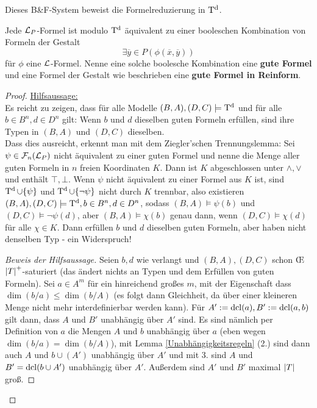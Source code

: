 Dieses B\&F-System beweist die Formelreduzierung in $\operatorname{T^d}$.
\begin{theorem}\label{Formelreduzierung}
	Jede $\mathcal{L}_P$-Formel ist modulo $\operatorname{T^d}$ äquivalent zu einer booleschen Kombination von Formeln der Gestalt
	$$\exists\overline{y}\in P(\phi(\overline{x},\overline{y}))$$
	für $\phi$ eine $\mathcal{L}$-Formel. Nenne eine solche boolesche Kombination eine \textbf{gute Formel} und eine Formel der Gestalt wie beschrieben eine \textbf{gute Formel in Reinform}.
\end{theorem}
\begin{proof}
	\underline{Hilfsaussage:}\\
	Es reicht zu zeigen, dass für alle Modelle $(B,A),(D,C)\models\operatorname{T^d}$ und für alle $b\in B^n,d\in D^n$ gilt: Wenn $b$ und $d$ dieselben guten Formeln erfüllen, sind ihre Typen in $(B,A)$ und $(D,C)$ dieselben.\\
	Dass dies ausreicht, erkennt man mit dem Ziegler'schen Trennungslemma: Sei $\psi\in\mathcal{F}_n(\mathcal{L}_P)$ nicht äquivalent zu einer guten Formel und nenne die Menge aller guten Formeln in $n$ freien Koordinaten $K$. Dann ist $K$ abgeschlossen unter $\land,\lor$ und enthält $\top,\bot$. Wenn $\psi$ nicht äquivalent zu einer Formel aus $K$ ist, sind $\operatorname{T^d}\cup\{\psi\}$ und $\operatorname{T^d}\cup\{\neg\psi\}$ nicht durch $K$ trennbar, also existieren $(B,A),(D,C)\models\operatorname{T^d},b\in B^n,d\in D^n$, sodass $(B,A)\models\psi(b)$ und $(D,C)\models\neg\psi(d)$, aber $(B,A)\models\chi(b)$ genau dann, wenn $(D,C)\models\chi(d)$ für alle $\chi\in K$. Dann erfüllen $b$ und $d$ dieselben guten Formeln, aber haben nicht denselben Typ - ein Widerspruch!\\
	\begin{proof}[Beweis der Hilfsaussage]
		Seien $b,d$ wie verlangt und $(B,A),(D,C)$ schon \OE\linebreak ${\left| T \right|}^+$-saturiert (das ändert nichts an Typen und dem Erfüllen von guten Formeln). Sei $a\in A^m$ für ein hinreichend großes $m$, mit der Eigenschaft dass $\dim(b/a)\leq\dim(b/A)$ (es folgt dann Gleichheit, da über einer kleineren Menge nicht mehr interdefinierbar werden kann). Für $A':=\operatorname{dcl}(a),B':=\operatorname{dcl}(a,b)$ gilt dann, dass $A$ und $B'$ unabhängig über $A'$ sind. Es sind nämlich per Definition von $a$ die Mengen $A$ und $b$ unabhängig über $a$ (eben wegen $\dim(b/a)=\dim(b/A)$), mit Lemma \ref{Unabhängigkeitsregeln} (2.) sind dann auch $A$ und $b\cup(A')$ unabhängig über $A'$ und mit 3. sind $A$ und $B'=\operatorname{dcl}(b\cup A')$ unabhängig über $A'$. Außerdem sind $A'$ und $B'$ maximal ${\left| T \right|}$ groß.\newpage

\end{proof}
\end{proof}
